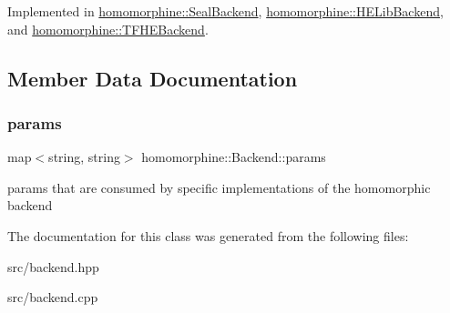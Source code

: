 Implemented in \mbox{\hyperlink{classhomomorphine_1_1_seal_backend_aa9fd3331b2c710e8fdfc3385bbf11eb5}{homomorphine\+::\+Seal\+Backend}}, \mbox{\hyperlink{classhomomorphine_1_1_h_e_lib_backend_a483a6695be2d733d48e2180ffb25d053}{homomorphine\+::\+H\+E\+Lib\+Backend}}, and \mbox{\hyperlink{classhomomorphine_1_1_t_f_h_e_backend_af3aee696d622e687ddb02c37fd1580d9}{homomorphine\+::\+T\+F\+H\+E\+Backend}}.



\subsection{Member Data Documentation}
\mbox{\label{classhomomorphine_1_1_backend_a008e8becd641dcb9ebebd94a91e67a1b}} 
\subsubsection{\texorpdfstring{params}{params}}
{\footnotesize\ttfamily map$<$string, string$>$ homomorphine\+::\+Backend\+::params\hspace{0.3cm}{\ttfamily [protected]}}

params that are consumed by specific implementations of the homomorphic backend 

The documentation for this class was generated from the following files\+:\begin{DoxyCompactItemize}
\item 
src/backend.\+hpp\item 
src/backend.\+cpp\end{DoxyCompactItemize}
